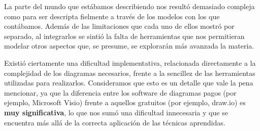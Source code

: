 La parte del mundo que estábamos describiendo nos resultó demasiado compleja
como para ser descripta fielmente a través de los modelos con los que
contábamos. Además de las limitaciones que cada uno de ellos mostró por
separado, al integrarlos se sintió la falta de herramientas que nos permitieran
modelar otros aspectos que, se presume, se explorarán más avanzada la materia.

Existió ciertamente una dificultad implementativa, relacionada directamente a la
complejidad de los diagramas necesarios, frente a la sencillez de las
herramientas utilizadas para realizarlos. Consideramos que esto es un detalle
que vale la pena mencionar, ya que la diferencia entre los software de diagramas
pagos (por ejemplo, Microsoft Visio) frente a aquellos gratuitos (por ejemplo,
draw.io) es \textbf{muy significativa}, lo que nos sumó una dificultad
innecesaria y que se encuentra más allá de la correcta aplicación de las
técnicas aprendidas.
